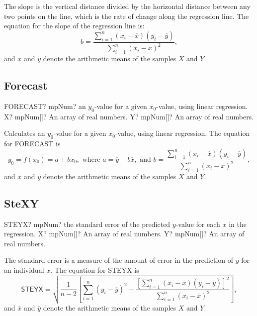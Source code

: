 \vspace{0.3cm}
The slope is the vertical distance divided by the horizontal distance between any two points on the line, which is the rate of change along the regression line. The equation for the slope of the regression line is: 
\begin{equation}
	b = \frac{\sum_{i=1}^n (x_i-\overline{x})(y_i-\overline{y})}{\sum_{i=1}^n (x_i-\overline{x})^2},
\end{equation}
and $\overline{x}$ and $\overline{y}$ denote the arithmetic means of the samples $X$ and $Y$.




\subsection{Forecast}

\begin{mpFunctionsExtract}
	\mpWorksheetFunctionTwoNotImplemented
	{FORECAST? mpNum? an $y_0$-value for a given $x_0$-value, using linear regression.}
	{X? mpNum[]? An array of real numbers.}
	{Y? mpNum[]? An array of real numbers.}
\end{mpFunctionsExtract}

\vspace{0.3cm}
Calculates an $y_0$-value for a given $x_0$-value, using linear regression. The equation for \textsf{FORECAST} is
\begin{equation}
	y_0 = f(x_0) = a+b x_0, \text{ where } a= \overline{y} - b \overline{x},  \text{ and }  b = \frac{\sum_{i=1}^n (x_i-\overline{x})(y_i-\overline{y})}{\sum_{i=1}^n (x_i-\overline{x})^2},
\end{equation}
and $\overline{x}$ and $\overline{y}$ denote the arithmetic means of the samples $X$ and $Y$.





\subsection{SteXY}

\begin{mpFunctionsExtract}
	\mpWorksheetFunctionTwoNotImplemented
	{STEYX? mpNum? the standard error of the predicted $y$-value for each $x$ in the regression.}
	{X? mpNum[]? An array of real numbers.}
	{Y? mpNum[]? An array of real numbers.}
\end{mpFunctionsExtract}

\vspace{0.3cm}
The standard error is a measure of the amount of error in the prediction of $y$ for an individual $x$. The equation for \textsf{STEYX} is
\begin{equation}
	\textsf{STEYX} =\sqrt{ \frac{1}{n-2} \left[ \sum_{i=1}^n (y_i-\overline{y})^2 - \frac{\left[\sum_{i=1}^n (x_i-\overline{x})(y_i-\overline{y})\right]^2}{\sum_{i=1}^n (x_i-\overline{x})^2} \right]},
\end{equation}
and $\overline{x}$ and $\overline{y}$ denote the arithmetic means of the samples $X$ and $Y$.





